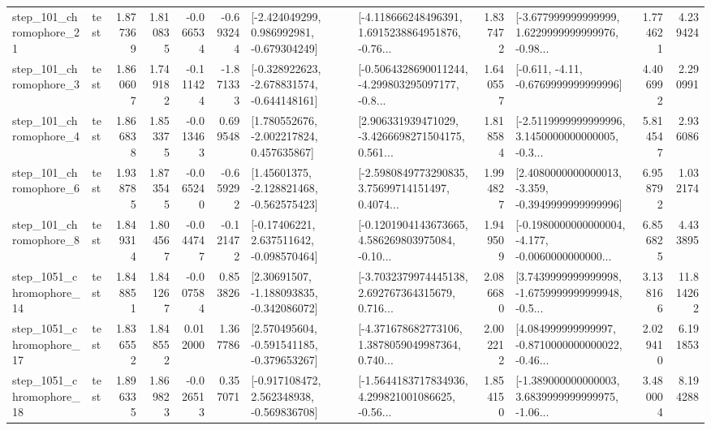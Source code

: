 \begin{tabular}{llrrrrllrlrr}
  step\_101\_chromophore\_21 &      test &      1.877369 &    1.810835 &     -0.066534 & -0.693244 &   [-2.424049299, 0.986992981, -0.679304249] &  [-4.118666248496391, 1.6915238864951876, -0.76... &       1.837472 &  [-3.677999999999999, 1.6229999999999976, -0.98... &            1.774621 &          4.239424 \\
   step\_101\_chromophore\_3 &      test &      1.860607 &    1.749182 &     -0.111424 & -1.871333 &  [-0.328922623, -2.678831574, -0.644148161] &  [-0.5064328690011244, -4.299803295097177, -0.8... &       1.640557 &               [-0.611, -4.11, -0.6769999999999996] &            4.406992 &          2.290991 \\
   step\_101\_chromophore\_4 &      test &      1.866838 &    1.853375 &     -0.013463 &  0.699548 &    [1.780552676, -2.002217824, 0.457635867] &  [2.906331939471029, -3.4266698271504175, 0.561... &       1.818584 &  [-2.5119999999999996, 3.1450000000000005, -0.3... &            5.814547 &          2.936086 \\
   step\_101\_chromophore\_6 &      test &      1.938785 &    1.873545 &     -0.065240 & -0.659292 &    [1.45601375, -2.128821468, -0.562575423] &  [-2.5980849773290835, 3.75699714151497, 0.4074... &       1.994827 &  [2.4080000000000013, -3.359, -0.3949999999999996] &            6.958792 &          1.032174 \\
   step\_101\_chromophore\_8 &      test &      1.849314 &    1.804567 &     -0.044747 & -0.121472 &    [-0.17406221, 2.637511642, -0.098570464] &  [-0.1201904143673665, 4.586269803975084, -0.10... &       1.949509 &  [-0.1980000000000004, -4.177, -0.0060000000000... &            6.856825 &          4.433895 \\
 step\_1051\_chromophore\_14 &      test &      1.848851 &    1.841267 &     -0.007584 &  0.853826 &    [2.30691507, -1.188093835, -0.342086072] &  [-3.7032379974445138, 2.692767364315679, 0.716... &       2.086680 &  [3.7439999999999998, -1.6759999999999948, -0.5... &            3.138166 &         11.814262 \\
 step\_1051\_chromophore\_17 &      test &      1.836552 &    1.848552 &      0.012000 &  1.367786 &   [2.570495604, -0.591541185, -0.379653267] &  [-4.371678682773106, 1.3878059049987364, 0.740... &       2.002212 &  [4.084999999999997, -0.8710000000000022, -0.46... &            2.029410 &          6.191853 \\
 step\_1051\_chromophore\_18 &      test &      1.896335 &    1.869823 &     -0.026513 &  0.357071 &   [-0.917108472, 2.562348938, -0.569836708] &  [-1.5644183717834936, 4.299821001086625, -0.56... &       1.854150 &  [-1.389000000000003, 3.6839999999999975, -1.06... &            3.480004 &          8.194288 \\

\end{tabular}

